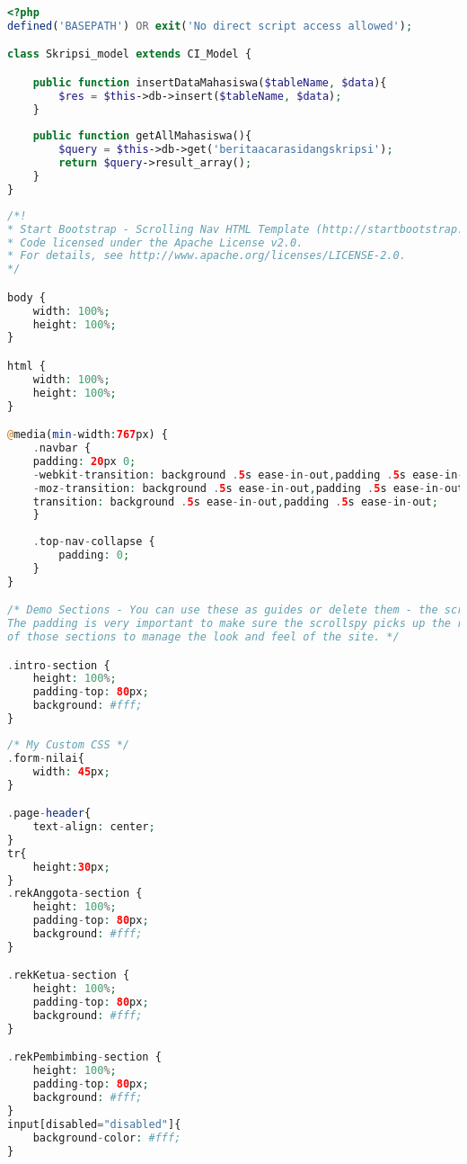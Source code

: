 \begin{lstlisting}[language=PHP,basicstyle=\tiny,caption=skripsi\_model.php]
<?php
defined('BASEPATH') OR exit('No direct script access allowed');

class Skripsi_model extends CI_Model {

	public function insertDataMahasiswa($tableName, $data){
		$res = $this->db->insert($tableName, $data);
	}
	
	public function getAllMahasiswa(){
		$query = $this->db->get('beritaacarasidangskripsi');
		return $query->result_array();
	}
}

\end{lstlisting}
\begin{lstlisting}[language=PHP,basicstyle=\tiny,caption=scrolling-nav.css]
/*!
* Start Bootstrap - Scrolling Nav HTML Template (http://startbootstrap.com)
* Code licensed under the Apache License v2.0.
* For details, see http://www.apache.org/licenses/LICENSE-2.0.
*/

body {
	width: 100%;
	height: 100%;
}

html {
	width: 100%;
	height: 100%;
}

@media(min-width:767px) {
	.navbar {
	padding: 20px 0;
	-webkit-transition: background .5s ease-in-out,padding .5s ease-in-out;
	-moz-transition: background .5s ease-in-out,padding .5s ease-in-out;
	transition: background .5s ease-in-out,padding .5s ease-in-out;
	}
	
	.top-nav-collapse {
		padding: 0;
	}
}

/* Demo Sections - You can use these as guides or delete them - the scroller will work with any sort of height, fixed, undefined, or percentage based.
The padding is very important to make sure the scrollspy picks up the right area when scrolled to. Adjust the margin and padding of sections and children 
of those sections to manage the look and feel of the site. */

.intro-section {
	height: 100%;
	padding-top: 80px;
	background: #fff;
}
\end{lstlisting}

\begin{lstlisting}[language=PHP,basicstyle=\tiny,caption=custom.css]
/* My Custom CSS */
.form-nilai{
	width: 45px;
}

.page-header{
	text-align: center;
}
tr{
	height:30px;
}
.rekAnggota-section {
	height: 100%;
	padding-top: 80px;
	background: #fff;
}

.rekKetua-section {
	height: 100%;
	padding-top: 80px;
	background: #fff;
}

.rekPembimbing-section {
	height: 100%;
	padding-top: 80px;
	background: #fff;
}
input[disabled="disabled"]{
	background-color: #fff;
}

\end{lstlisting}

